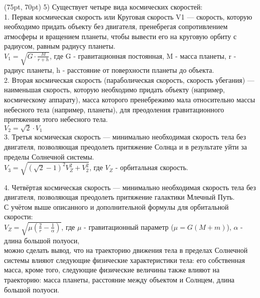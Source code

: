 \documentclass{article}
\begin{document}
\begin{textblock*}{475pt}(75pt, 70pt)
5) Существует четыре вида космических скоростей: \\

1. Первая космическая скорость или Круговая скорость V1 — скорость, которую необходимо придать объекту без двигателя, пренебрегая сопротивлением атмосферы и вращением планеты, чтобы вывести его на круговую орбиту с радиусом, равным радиусу планеты. \\
$V_1 = \sqrt{G \cdot \frac{M}{r + h}}$, где G - гравитационная постоянная, M - масса планеты, r - радиус планеты, h - расстояние от поверхности планеты до объекта. \\

2. Вторая космическая скорость (параболическая скорость, скорость убегания) — наименьшая скорость, которую необходимо придать объекту (например, космическому аппарату), масса которого пренебрежимо мала относительно массы небесного тела (например, планеты), для преодоления гравитационного притяжения этого небесного тела. \\
$V_2 = \sqrt{2} \cdot V_1$ \\

3. Третья космическая скорость — минимально необходимая скорость тела без двигателя, позволяющая преодолеть притяжение Солнца и в результате уйти за пределы Солнечной системы. \\
$V_3 = \sqrt{(\sqrt{2} - 1)^2 V_Z^2 + V_2^2}$, где $V_Z$ - орбитальная скорость.

4. Четвёртая космическая скорость — минимально необходимая скорость тела без двигателя, позволяющая преодолеть притяжение галактики Млечный Путь. \\

С учётом выше описанного и дополнительной формулы для орбитальной скорости: \\
$V_Z = \sqrt{\mu(\frac{2}{r} - \frac{1}{\alpha})}$, где $\mu$ - гравитационный параметр ($\mu = G(M + m)$), $\alpha$ - длина большой полуоси,\\
можно сделать вывод, что на траекторию движения тела в пределах Солнечной системы влияют следующие физические характеристики тела: его собственная масса, кроме того, следующие физические величины также влияют на траекторию: масса планеты, расстояние между объектом и Солнцем, длина большой полуоси.

\end{textblock*}
\end{document}
